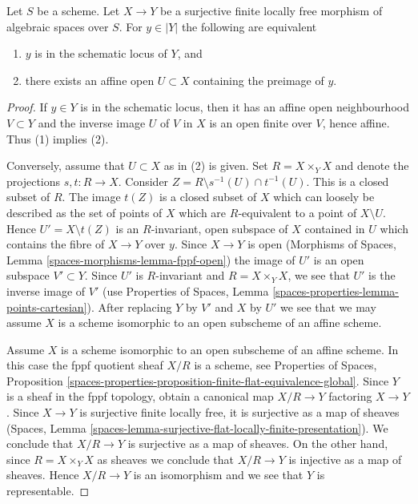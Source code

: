 \begin{lemma}
\label{lemma-when-quotient-scheme-at-point}
Let $S$ be a scheme. Let $X \to Y$ be a surjective finite locally free
morphism of algebraic spaces over $S$. For $y \in |Y|$ the following are
equivalent
\begin{enumerate}
\item $y$ is in the schematic locus of $Y$, and
\item there exists an affine open $U \subset X$
containing the preimage of $y$.
\end{enumerate}
\end{lemma}

\begin{proof}
If $y \in Y$ is in the schematic locus, then it has an affine open
neighbourhood $V \subset Y$ and the inverse image $U$ of $V$ in $X$
is an open finite over $V$, hence affine. Thus (1) implies (2).

\medskip\noindent
Conversely, assume that $U \subset X$ as in (2) is given.
Set $R = X \times_Y X$ and denote the projections $s, t : R \to X$.
Consider $Z = R \setminus s^{-1}(U) \cap t^{-1}(U)$.
This is a closed subset of $R$. The image $t(Z)$ is a closed
subset of $X$ which can loosely be described as the set of
points of $X$ which are $R$-equivalent to a point of
$X \setminus U$. Hence $U' = X \setminus t(Z)$ is an $R$-invariant,
open subspace of $X$ contained in $U$ which contains
the fibre of $X \to Y$ over $y$. Since $X \to Y$ is open
(Morphisms of Spaces, Lemma \ref{spaces-morphisms-lemma-fppf-open})
the image of $U'$ is an open subspace $V' \subset Y$.
Since $U'$ is $R$-invariant and $R = X \times_Y X$, we see that $U'$ is the
inverse image of $V'$ (use
Properties of Spaces, Lemma \ref{spaces-properties-lemma-points-cartesian}).
After replacing $Y$ by $V'$ and $X$ by $U'$ we see that we may assume
$X$ is a scheme isomorphic to an open subscheme of an affine scheme.

\medskip\noindent
Assume $X$ is a scheme isomorphic to an open subscheme of an affine scheme.
In this case the fppf quotient sheaf $X/R$ is a scheme, see
Properties of Spaces, Proposition
\ref{spaces-properties-proposition-finite-flat-equivalence-global}.
Since $Y$ is a sheaf in the fppf topology, obtain a canonical
map $X/R \to Y$ factoring $X \to Y$. Since $X \to Y$ is surjective
finite locally free, it is surjective as a map of sheaves
(Spaces, Lemma \ref{spaces-lemma-surjective-flat-locally-finite-presentation}).
We conclude that $X/R \to Y$ is surjective as a map of sheaves.
On the other hand, since $R = X \times_Y X$ as sheaves we conclude that
$X/R \to Y$ is injective as a map of sheaves. Hence $X/R \to Y$
is an isomorphism and we see that $Y$ is representable.
\end{proof}

